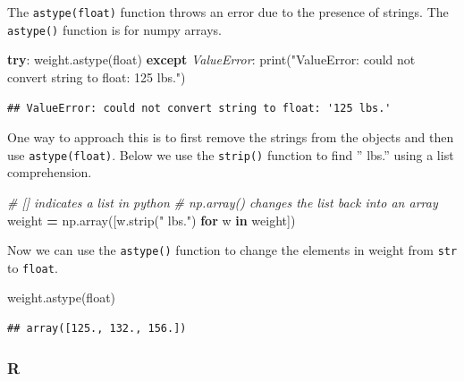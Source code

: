 \documentclass[
]{book}
\newenvironment{Shaded}{\begin{snugshade}}{\end{snugshade}}
\newcommand{\BuiltInTok}[1]{#1}
\newcommand{\CommentTok}[1]{\textcolor[rgb]{0.56,0.35,0.01}{\textit{#1}}}
\newcommand{\ControlFlowTok}[1]{\textcolor[rgb]{0.13,0.29,0.53}{\textbf{#1}}}
\newcommand{\KeywordTok}[1]{\textcolor[rgb]{0.13,0.29,0.53}{\textbf{#1}}}
\newcommand{\NormalTok}[1]{#1}
\newcommand{\OperatorTok}[1]{\textcolor[rgb]{0.81,0.36,0.00}{\textbf{#1}}}
\newcommand{\PreprocessorTok}[1]{\textcolor[rgb]{0.56,0.35,0.01}{\textit{#1}}}
\newcommand{\StringTok}[1]{\textcolor[rgb]{0.31,0.60,0.02}{#1}}
\begin{document}
The \texttt{astype(float)} function throws an error due to the presence of strings. The \texttt{astype()} function is for numpy arrays.

\begin{Shaded}
\begin{Highlighting}[]
\ControlFlowTok{try}\NormalTok{:}
\NormalTok{  weight.astype(}\BuiltInTok{float}\NormalTok{)}
\ControlFlowTok{except} \PreprocessorTok{ValueError}\NormalTok{:}
  \BuiltInTok{print}\NormalTok{(}\StringTok{"ValueError: could not convert string to float: \textquotesingle{}125 lbs.\textquotesingle{}"}\NormalTok{)}
\end{Highlighting}
\end{Shaded}

\begin{verbatim}
## ValueError: could not convert string to float: '125 lbs.'
\end{verbatim}

One way to approach this is to first remove the strings from the objects and then use \texttt{astype(float)}. Below we use the \texttt{strip()} function to find '' lbs.'' using a list comprehension.

\begin{Shaded}
\begin{Highlighting}[]
\CommentTok{\# [] indicates a list in python}
\CommentTok{\# np.array() changes the list back into an array}
\NormalTok{weight }\OperatorTok{=}\NormalTok{ np.array([w.strip(}\StringTok{" lbs."}\NormalTok{) }\ControlFlowTok{for}\NormalTok{ w }\KeywordTok{in}\NormalTok{ weight])}
\end{Highlighting}
\end{Shaded}

Now we can use the \texttt{astype()} function to change the elements in weight from \texttt{str} to \texttt{float}.

\begin{Shaded}
\begin{Highlighting}[]
\NormalTok{weight.astype(}\BuiltInTok{float}\NormalTok{)}
\end{Highlighting}
\end{Shaded}

\begin{verbatim}
## array([125., 132., 156.])
\end{verbatim}

\hypertarget{r-23}{%
\subsubsection*{R}\label{r-23}}
\end{document}
